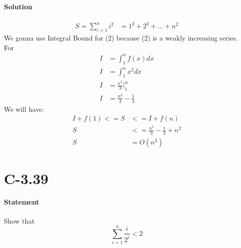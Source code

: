 \documentclass{article}
\begin{document}
  \paragraph{Solution}
  \begin{align}
    S=\sum_{i=1}^{n}i^2 &= 1^2 + 2^2 + ... + n^2
  \end{align}
  We gonna use Integral Bound for (2) because (2) is a weakly increasing series.
  For 
  \begin{align*}
    I &= \int_{1}^{n}f(x)dx\\
    I &= \int_{1}^{n}x^2dx\\
    I &= \frac{x^3}{3} \Big|_1^n\\
    I &= \frac{n^3}{3} - \frac{1}{3}
  \end{align*}
  We will have:
  \begin{align*}
    I + f(1) <= S &<= I + f(n)\\
    S &<= \frac{n^3}{3} - \frac{1}{3} + n^2\\
    S &= O(n^3)
  \end{align*}

\newpage
\section{C-3.39}
  \setlength{\parindent}{3ex}
  \paragraph{Statement}
  Show that 
  \begin{equation}
    \sum_{i=1}^{n}\frac{i}{2^i} < 2
  \end{equation}
\end{document}
